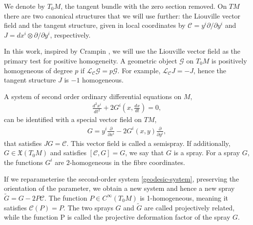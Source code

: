 \documentclass[oneside,english]{amsart}
\theoremstyle{definition}
\theoremstyle{plain}
\theoremstyle{plain}
\theoremstyle{plain}
\theoremstyle{remark}
\theoremstyle{remark}
\theoremstyle{remark}
\begin{document}
We denote by $T_0M$, the tangent bundle with the zero section removed.
On $TM$ there are two canonical structures that we will use further: the Liouville vector field and the tangent structure, given in local coordinates by $\mathcal{C}=y^i{\partial}/{\partial y^i}$ and $J=dx^i\otimes {\partial}/{\partial y^i}$, respectively. 

In this work, inspired by Crampin \cite{Crampin24}, we will use the Liouville vector field as the primary test for positive homogeneity. A geometric object $\mathcal{G}$ on $T_0M$ is positively homogeneous of degree $p$ if $\mathcal{L}_{\mathcal{C}}\mathcal{G}=p\mathcal{G}$. For example, $\mathcal{L}_{\mathcal{C}}J=-J$, hence the tangent structure $J$ is $-1$ homogeneous. 

A system of second order ordinary differential equations on $M$,
\begin{eqnarray}
\label{geodesic-system}
\frac{d^2x^i}{dt^2}+2G^i\left(x,\frac{dx}{dt}\right)=0,
\end{eqnarray}
can be identified with a special vector field on $TM$,
\begin{eqnarray*}
G=y^i\frac{\partial}{\partial x^i}-2G^i(x,y)\frac{\partial}{\partial y^i},
\end{eqnarray*}
that satisfies $JG=\mathcal{C}$. This vector field is called a semispray. If additionally, $G\in \mathfrak{X}(T_0M)$ and satisfies $[\mathcal{C},G]=G$, we say that $G$ is a spray. For a spray $G$, the functions $G^i$ are $2$-homogeneous in the fibre coordinates.

If we reparameterise the second-order system \eqref{geodesic-system}, preserving the orientation of the parameter, we obtain a new system and hence a new spray $\widetilde{G}=G-2P\mathcal{C}$.
The function $P\in C^\infty(T_0M)$ is 1-homogeneous, meaning it satisfies $\mathcal{C}(P)=P$. The two sprays $G$ and $\widetilde{G}$ are called projectively related, while the function P is called
the projective deformation factor of the spray $G$. 
\end{document}
